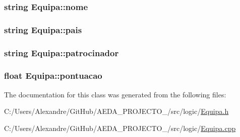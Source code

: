 \subsubsection[{nome}]{\setlength{\rightskip}{0pt plus 5cm}string Equipa\+::nome\hspace{0.3cm}{\ttfamily [private]}}\label{class_equipa_a8373ab9d0fe95ae0c231bf2d9707e759}
\hypertarget{class_equipa_a9972aebf308a7adcd5e23d127639311f}{}
\subsubsection[{pais}]{\setlength{\rightskip}{0pt plus 5cm}string Equipa\+::pais\hspace{0.3cm}{\ttfamily [private]}}\label{class_equipa_a9972aebf308a7adcd5e23d127639311f}
\hypertarget{class_equipa_ac9a1c45750e118888d61930c3bf4d185}{}
\subsubsection[{patrocinador}]{\setlength{\rightskip}{0pt plus 5cm}string Equipa\+::patrocinador\hspace{0.3cm}{\ttfamily [private]}}\label{class_equipa_ac9a1c45750e118888d61930c3bf4d185}
\hypertarget{class_equipa_a1b047e8ef3d73dd54b656af9dbfcf9ae}{}
\subsubsection[{pontuacao}]{\setlength{\rightskip}{0pt plus 5cm}float Equipa\+::pontuacao\hspace{0.3cm}{\ttfamily [private]}}\label{class_equipa_a1b047e8ef3d73dd54b656af9dbfcf9ae}


The documentation for this class was generated from the following files\+:\begin{DoxyCompactItemize}
\item 
C\+:/\+Users/\+Alexandre/\+Git\+Hub/\+A\+E\+D\+A\+\_\+\+P\+R\+O\+J\+E\+C\+T\+O\+\_/src/logic/\hyperlink{_equipa_8h}{Equipa.\+h}\item 
C\+:/\+Users/\+Alexandre/\+Git\+Hub/\+A\+E\+D\+A\+\_\+\+P\+R\+O\+J\+E\+C\+T\+O\+\_/src/logic/\hyperlink{_equipa_8cpp}{Equipa.\+cpp}\end{DoxyCompactItemize}
